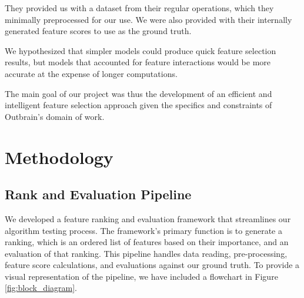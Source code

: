 \documentclass[fleqn,moreauthors,10pt]{ds_report}
\begin{document}
They provided us with a dataset from their regular operations, which they minimally preprocessed for our use. We were also provided with their internally generated feature scores to use as the ground truth.


We hypothesized that simpler models could produce quick feature selection results, but models that accounted for feature interactions would be more accurate at the expense of longer computations.

The main goal of our project was thus the development of an efficient and intelligent feature selection approach given the specifics and constraints of Outbrain's domain of work.

	




\section*{Methodology}

\subsection*{Rank and Evaluation Pipeline}

We developed a feature ranking and evaluation framework that streamlines our algorithm testing process. The framework's primary function is to generate a ranking, which is an ordered list of features based on their importance, and an evaluation of that ranking. This pipeline handles data reading, pre-processing, feature score calculations, and evaluations against our ground truth. To provide a visual representation of the pipeline, we have included a flowchart in Figure \ref{fig:block_diagram}.
\end{document}
